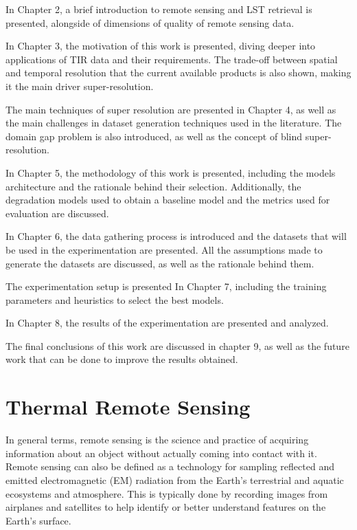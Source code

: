 In Chapter 2, a brief introduction to remote sensing and LST retrieval is presented, alongside of dimensions of quality of remote sensing data.

In Chapter 3, the motivation of this work is presented, diving deeper into applications of TIR data and their requirements.
The trade-off between spatial and temporal resolution that the current available products is also shown, making it the main driver super-resolution.

The main techniques of super resolution are presented in Chapter 4, as well as the main challenges in dataset generation techniques used in the literature.
The domain gap problem is also introduced, as well as the concept of blind super-resolution.

In Chapter 5, the methodology of this work is presented, including the models architecture and the rationale behind their selection. Additionally, the degradation models used to obtain a baseline model and the metrics used for evaluation are discussed.

In Chapter 6, the data gathering process is introduced and the datasets that will be used in the experimentation are presented. All the assumptions made to generate the datasets are discussed, as well as the rationale behind them.

The experimentation setup is presented In Chapter 7, including the training parameters and heuristics to select the best models.

In Chapter 8, the results of the experimentation are presented and analyzed.

The final conclusions of this work are discussed in chapter 9, as well as the future work that can be done to improve the results obtained.

\newpage

    
\section{Thermal Remote Sensing} \label{sec:thermal_remote_sensing}

In general terms, remote sensing is the science and practice of acquiring information about an object without actually coming into contact with it.
Remote sensing can also be defined as a technology for sampling reflected and emitted electromagnetic (EM) radiation from the Earth’s terrestrial and aquatic ecosystems and atmosphere.
This is typically done by recording images from airplanes and satellites to help identify or better understand features on the Earth’s surface.

